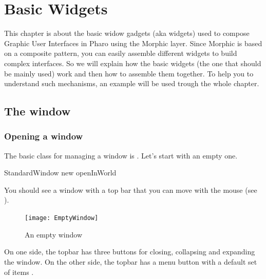\documentclass[a4paper,10pt,twoside]{book}
\begin{document}
\fi
\sloppy

\chapter{Basic Widgets}

This chapter is about the basic widow gadgets (aka widgets) used to compose Graphic User Interfaces in Pharo using the Morphic layer. Since Morphic is based on a composite pattern,  you can easily assemble different widgets to build complex interfaces. So we will explain how the basic widgets (the one that should be mainly used) work and then how to assemble them together. To help you to understand such mechanisms, an example will be used trough the whole chapter.

\section{The window}


\subsection{Opening a window}
The basic class for managing a window is . Let's start with an empty one.

\begin{code}{}
StandardWindow new openInWorld
\end{code}
You should see a window with a top bar  that you can move with the mouse (see ). 

\begin{figure}[ht]
\begin{center}
	\texttt{[image: EmptyWindow]}
	\caption{An empty window}
\end{center}
\end{figure} 

On one side, the topbar has three buttons for closing, collapsing and expanding the window. On the other side, the topbar has a menu button with a default set of items .
\end{document}
